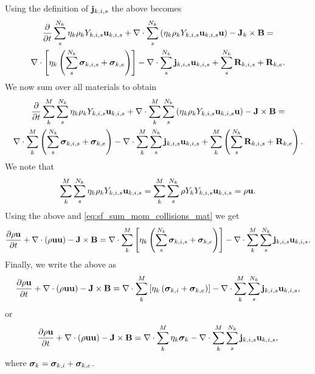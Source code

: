 \documentclass[a4paper,11pt]{report}
\begin{document}
Using the definition of $\mathbf{j}_{k,i,s}$ the above becomes
\begin{multline*}
    \frac{\partial}{\partial t} \sum_s^{N_k} \eta_k \rho_k Y_{k,i,s} \mathbf{u}_{k,i,s} + \nabla \cdot \sum_s^{N_k} \left( \eta_k \rho_k Y_{k,i,s} \mathbf{u}_{k,i,s} \mathbf{u}  \right) - \mathbf{J}_k \times \mathbf{B} = \\
    \nabla \cdot \left[ \eta_k \left( \sum_s^{N_k} \bm \sigma_{k,i,s} + \bm \sigma_{k,e} \right) \right] - \nabla \cdot \sum_s^{N_k} \mathbf{j}_{k,i,s} \mathbf{u}_{k,i,s} + \sum_s^{N_k} \mathbf{R}_{k,i,s} + \mathbf{R}_{k,e}.
\end{multline*}
We now sum over all materials to obtain
\begin{multline*}
    \frac{\partial}{\partial t} \sum_k^M \sum_s^{N_k} \eta_k \rho_k Y_{k,i,s} \mathbf{u}_{k,i,s} + \nabla \cdot \sum_k^M \sum_s^{N_k} \left( \eta_k \rho_k Y_{k,i,s} \mathbf{u}_{k,i,s} \mathbf{u}  \right) - \mathbf{J} \times \mathbf{B} = \\
    \nabla \cdot \sum_k^M \left( \sum_s^{N_k} \bm \sigma_{k,i,s} + \bm \sigma_{k,e} \right) - \nabla \cdot \sum_k^M \sum_s^{N_k} \mathbf{j}_{k,i,s} \mathbf{u}_{k,i,s} + \sum_k^M \left( \sum_s^{N_k} \mathbf{R}_{k,i,s} + \mathbf{R}_{k,e} \right).
\end{multline*}
We note that
\begin{equation}
    \sum_k^M \sum_s^{N_k} \eta_k \rho_k Y_{k,i,s} \mathbf{u}_{k,i,s} =  \sum_k^M \sum_s^{N_k} \rho Y_k Y_{k,i,s} \mathbf{u}_{k,i,s} = \rho \mathbf{u}.
\end{equation}
Using the above and \cref{eq:sf_sum_mom_collisions_mat} we get
\begin{equation*}
    \frac{\partial \rho \mathbf{u}}{\partial t} + \nabla \cdot \left( \rho \mathbf{u} \mathbf{u} \right) - \mathbf{J} \times \mathbf{B} = \nabla \cdot \sum_k^M \left[ \eta_k \left( \sum_s^{N_k} \bm \sigma_{k,i,s} + \bm \sigma_{k,e} \right) \right] - \nabla \cdot \sum_k^M \sum_s^{N_k} \mathbf{j}_{k,i,s} \mathbf{u}_{k,i,s}.
\end{equation*}
Finally, we write the above as
\begin{equation*}
    \frac{\partial \rho \mathbf{u}}{\partial t} + \nabla \cdot \left( \rho \mathbf{u} \mathbf{u} \right) - \mathbf{J} \times \mathbf{B} = \nabla \cdot \sum_k^M \left[ \eta_k \left( \bm \sigma_{k,i} + \bm \sigma_{k,e} \right) \right] - \nabla \cdot \sum_k^M \sum_s^{N_k} \mathbf{j}_{k,i,s} \mathbf{u}_{k,i,s},
\end{equation*}
or 
\begin{equation*}
    \frac{\partial \rho \mathbf{u}}{\partial t} + \nabla \cdot \left( \rho \mathbf{u} \mathbf{u} \right) - \mathbf{J} \times \mathbf{B} = \nabla \cdot \sum_k^M \eta_k \bm \sigma_k - \nabla \cdot \sum_k^M \sum_s^{N_k} \mathbf{j}_{k,i,s} \mathbf{u}_{k,i,s},
\end{equation*}
where $\bm \sigma_k = \bm \sigma_{k,i} + \bm \sigma_{k,e}$.
\end{document}
